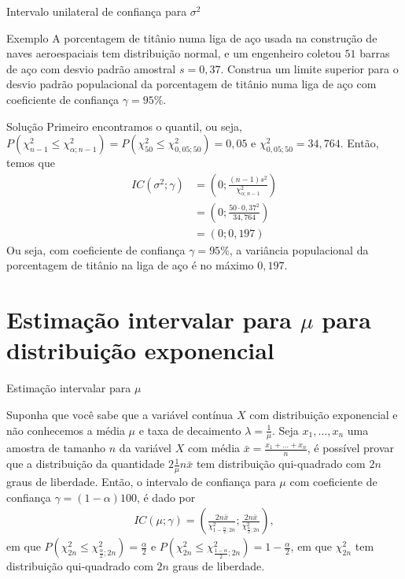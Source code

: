\documentclass[8pt]{beamer}
\begin{document}
\begin{frame}{Intervalo unilateral de confiança para $\sigma^2$}

\normalsize

\begin{block}{Exemplo}
	A porcentagem de titânio numa liga de aço usada na construção de naves aeroespaciais tem distribuição normal, e um engenheiro coletou $51$ barras de aço com desvio padrão amostral $s=0,37$. Construa um limite superior para o desvio padrão populacional da porcentagem de titânio numa liga de aço com coeficiente de confiança $\gamma=95\%$.
\end{block}

\begin{block}{Solução}
	Primeiro encontramos o quantil, ou seja, $P\left( \chi^2_ {n-1} \leq \chi^2_{\alpha; n-1} \right) = P\left( \chi^2_ {50} \leq \chi^2_{0,05; 50} \right) = 0,05$ e $\chi^2_{0,05; 50} = 34,764$. Então, temos que
	\begin{align*}
		IC(\sigma^2; \gamma) &= \left( 0; \frac{(n-1)s^2}{\chi^2_{\alpha; n-1}} \right)\\
		&= \left( 0; \frac{50\cdot 0,37^2}{34,764} \right)\\
		&= \left(0; 0,197\right)
	\end{align*}
	Ou seja, com coeficiente de confiança $\gamma=95\%$, a variância populacional da porcentagem de titânio na liga de aço é no máximo $0,197$.
\end{block}

\normalsize

\end{frame}

\section{Estimação intervalar para $\mu$ para distribuição exponencial}

\begin{frame}{Estimação intervalar para $\mu$}
	
\LARGE

Suponha que você sabe que a variável contínua $X$ com distribuição exponencial e não conhecemos a média $\mu$ e taxa de decaimento $\lambda = \frac{1}{\mu}$. Seja $x_1, \dots, x_n$ uma amostra de tamanho $n$ da variável $X$ com média $\bar{x} = \frac{x_1 + \dots + x_n}{n}$, é possível provar que a distribuição da quantidade $2 \frac{1}{\mu} n \bar{x}$ tem distribuição qui-quadrado com $2n$ graus de liberdade. Então, o intervalo de confiança para $\mu$ com coeficiente de confiança $\gamma = (1-\alpha)100$, é dado por
\begin{align*}
	IC(\mu; \gamma) = \left( \frac{2 n \bar{x}}{\chi^2_{1-\frac{\alpha}{2}; 2n}}; \frac{2 n \bar{x}}{\chi^2_{\frac{\alpha}{2}; 2n}} \right),
\end{align*}
em que $P\left( \chi^2_{2n} \leq \chi^2_{\frac{\alpha}{2}; 2n} \right) = \frac{\alpha}{2}$ e $P\left( \chi^2_{2n} \leq \chi^2_{\frac{1-\alpha}{2}; 2n} \right) = 1- \frac{\alpha}{2}$, em que $\chi^2_{2n}$ tem distribuição qui-quadrado com $2n$ graus de liberdade.

\normalsize

\end{frame}
\end{document}
